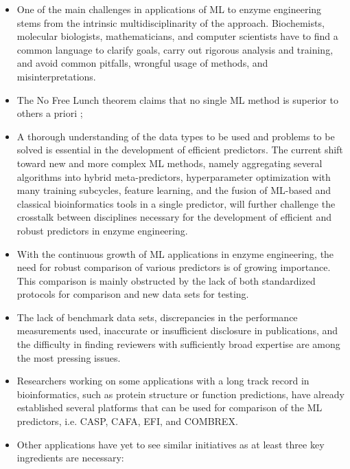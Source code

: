 \documentclass[12pt]{article}
\begin{document}
\begin{itemize}

\item One of the main challenges in applications of ML to enzyme engineering stems from the intrinsic multidisciplinarity of the approach. Biochemists, molecular biologists, mathematicians, and computer scientists have to find a common language to clarify goals, carry out rigorous analysis and training, and avoid common pitfalls, wrongful usage of methods, and misinterpretations.

\item The No Free Lunch theorem \cite{85} claims that no single ML method is superior to others a priori \cite{86}; 


\item A thorough understanding of the data types to be used and problems to be solved is essential in the development of efficient predictors. The current shift toward new and more complex ML methods, namely aggregating several algorithms into hybrid meta-predictors, hyperparameter optimization with many training subcycles, feature learning, and the fusion of ML-based and classical bioinformatics tools in a single predictor, will further challenge the crosstalk between disciplines necessary for the development of efficient and robust predictors in enzyme engineering.

\item With the continuous growth of ML applications in enzyme engineering, the need for robust comparison of various predictors is of growing importance. This comparison is mainly obstructed by the lack of both standardized protocols for comparison and new data sets for testing. 

\item The lack of benchmark data sets, discrepancies in the performance measurements used, inaccurate or insufficient disclosure in publications, and the difficulty in finding reviewers with sufficiently broad expertise \cite{87} are among the most pressing issues. 

\item Researchers working on some applications with a long track record in bioinformatics, such as protein structure or function predictions, have already established several platforms that can be used for comparison of the ML predictors, i.e. CASP, CAFA, EFI, and COMBREX.

\item Other applications have yet to see similar initiatives as at least three key ingredients are necessary: 


\end{itemize}
\end{document}
